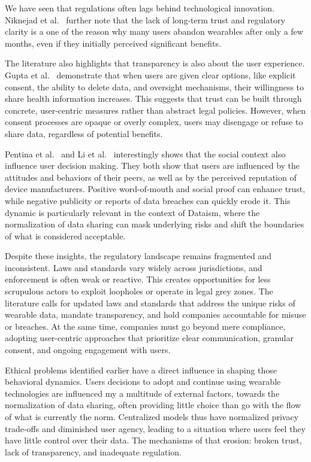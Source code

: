 	We have seen that regulations often lags behind technological innovation. Niknejad et al.~\cite{Niknejad2020} further note that the lack of long-term trust and regulatory clarity is a one of the reason why many users abandon wearables after only a few months, even if they initially perceived significant benefits.

	The literature also highlights that transparency is also about the user experience. Gupta et al.~\cite{Gupta2023} demonstrate that when users are given clear options, like explicit consent, the ability to delete data, and oversight mechanisms, their willingness to share health information increases. This suggests that trust can be built through concrete, user-centric measures rather than abstract legal policies. However, when consent processes are opaque or overly complex, users may disengage or refuse to share data, regardless of potential benefits.

	Pentina et al.~\cite{Pentina2016} and Li et al.~\cite{Li2019} interestingly shows that the social context also influence user decision making. They both show that users are influenced by the attitudes and behaviors of their peers, as well as by the perceived reputation of device manufacturers. Positive word-of-mouth and social proof can enhance trust, while negative publicity or reports of data breaches can quickly erode it. This dynamic is particularly relevant in the context of Dataism, where the normalization of data sharing can mask underlying risks and shift the boundaries of what is considered acceptable.

	Despite these insights, the regulatory landscape remains fragmented and inconsistent. Laws and standards vary widely across jurisdictions, and enforcement is often weak or reactive. This creates opportunities for less scrupulous actors to exploit loopholes or operate in legal grey zones. The literature calls for updated laws and standards that address the unique risks of wearable data, mandate transparency, and hold companies accountable for misuse or breaches. At the same time, companies must go beyond mere compliance, adopting user-centric approaches that prioritize clear communication, granular consent, and ongoing engagement with users.

	Ethical problems identified earlier have a direct influence in shaping those behavioral dynamics. Users decisions to adopt and continue using wearable technologies are influenced my a multitude of external factors, towards the normalization of data sharing, often providing little choice than go with the flow of what is currently the norm. Centralized models thus have normalized privacy trade-offs and diminished user agency, leading to a situation where users feel they have little control over their data. The mechanisms of that erosion: broken trust, lack of transparency, and inadequate regulation.
